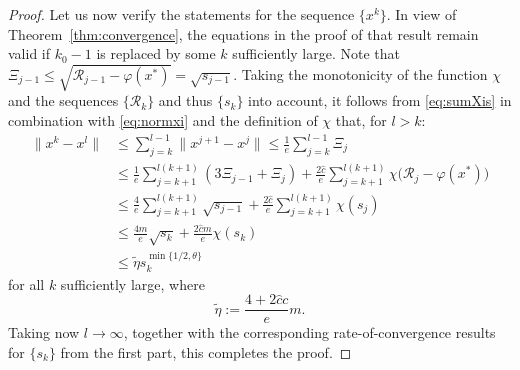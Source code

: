 \documentclass[a4paper, 12pt]{article}
\numberwithin{equation}{section}
\theoremstyle{bolddef}
\theoremstyle{definition}
\theoremstyle{boldplain}
\newcommand{\xk}{x^k}
\newcommand{\Rvalue}{\mathcal{R}}
\begin{document}
\begin{proof}
Let us now verify the statements for the sequence $\{\xk\}$. In view of Theorem~\ref{thm:convergence}, the equations in the proof of that result remain valid if $k_0-1$ is replaced by some $k$ sufficiently large. Note that $\Xi_{j-1} \leq \sqrt{\Rvalue_{j-1} - \varphi(x^*)} = \sqrt{s_{j-1}}$. Taking the monotonicity of the function $\chi$ and the sequences $\{\Rvalue_k\}$ and thus $\{s_k\}$ into account, it follows from \eqref{eq:sumXis} in combination with \eqref{eq:normxi} and the definition of $\chi$ that, for $l>k$:
\begin{align*}
	\|\xk - x^l\| &\leq \sum_{j=k}^{l-1} \|x^{j+1}-x^j\| \leq \frac{1}{e} \sum_{j=k}^{l-1} \Xi_j  \\
	&\leq \frac{1}{e} \sum_{j=k+1}^{l(k+1)} (3\Xi_{j-1} + \Xi_j) + \frac{2 \hat c}{e} \sum_{j = k+1}^{l(k+1)}\chi \big( \Rvalue_j - \varphi(x^*) \big)\\
	&\leq \frac{4}{e} \sum_{j=k+1}^{l(k+1)} \sqrt{s_{j-1}} + \frac{2 \hat c}{e} \sum_{j = k+1}^{l(k+1)}\chi ( s_j )\\
	&\leq \frac{4m}{e} \sqrt{s_k} + \frac{2 \hat c m}{e}\chi ( s_k )\\
	&\leq \tilde \eta s_k^{\min\{1/2, \theta \}}
\end{align*}
for all $ k $ sufficiently large, where 
\begin{equation*}
\tilde \eta := \frac{4 + 2 \hat c c}{e}m.
\end{equation*}
Taking now $l \to \infty$, together with the corresponding rate-of-convergence results for $\{s_k\}$ from the first part, this completes the proof.
\end{proof}
\end{document}
